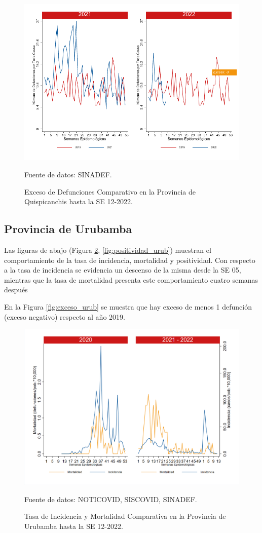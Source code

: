 \documentclass[12pt,a4paper,openany]{book}
\begin{document}
		\begin{figure}[h]
			\caption{Exceso de Defunciones Comparativo en la Provincia de Quispicanchis hasta la SE 12-2022.}\label{fig:exceso_quisp}
			\begin{center}
				\includegraphics[width=0.7\linewidth]{../figuras/exceso_12.pdf}
			\end{center}
			{\footnotesize {Fuente de datos: SINADEF.}}
		\end{figure}
		
		\clearpage
		
		\subsection*{Provincia de Urubamba}
		\noindent Las figuras de abajo (Figura \ref{fig:inc_urub}, \ref{fig:positividad_urub}) muestran el comportamiento de la tasa de incidencia, mortalidad y positividad. Con respecto a la tasa de incidencia se evidencia un descenso de la misma desde la SE 05, mientras que la tasa de mortalidad presenta este comportamiento cuatro semanas después 
	
		En la Figura \ref{fig:exceso_urub} se muestra que hay exceso de menos 1 defunción (exceso negativo) respecto al año 2019.
		
		\begin{figure}[h]
			\caption{Tasa de Incidencia y Mortalidad Comparativa en la Provincia de Urubamba hasta la SE 12-2022.}\label{fig:inc_urub}
			\begin{center}
				\includegraphics[width=0.85\linewidth]{../figuras/incidencia_mortalidad_20_21_13.png}
			\end{center}
			{\footnotesize {Fuente de datos: NOTICOVID, SISCOVID, SINADEF.}}
		\end{figure}
		
\end{document}
